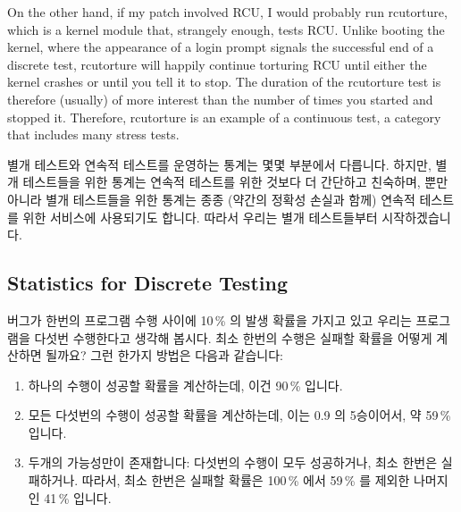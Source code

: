 On the other hand, if my patch involved RCU, I would probably run
rcutorture, which is a kernel module that, strangely enough, tests RCU.
Unlike booting the kernel, where the appearance of a login prompt
signals the successful end of a discrete test, rcutorture will happily
continue torturing RCU until either the kernel crashes or until you
tell it to stop.
The duration of the rcutorture test is therefore (usually) of more
interest than the number of times you started and stopped it.
Therefore, rcutorture is an example of a continuous test, a category
that includes many stress tests.
\fi

별개 테스트와 연속적 테스트를 운영하는 통계는 몇몇 부분에서 다릅니다.
하지만, 별개 테스트들을 위한 통계는 연속적 테스트를 위한 것보다 더 간단하고
친숙하며, 뿐만아니라 별개 테스트들을 위한 통계는 종종 (약간의 정확성 손실과
함께) 연속적 테스트를 위한 서비스에 사용되기도 합니다.
따라서 우리는 별개 테스트들부터 시작하겠습니다.

\subsection{Statistics for Discrete Testing}
\label{sec:debugging:Statistics for Discrete Testing}

버그가 한번의 프로그램 수행 사이에 10\,\% 의 발생 확률을 가지고 있고 우리는
프로그램을 다섯번 수행한다고 생각해 봅시다.
최소 한번의 수행은 실패할 확률을 어떻게 계산하면 될까요?
그런 한가지 방법은 다음과 같습니다:

\begin{enumerate}
\item	하나의 수행이 성공할 확률을 계산하는데, 이건 90\,\% 입니다.
\item	모든 다섯번의 수행이 성공할 확률을 계산하는데, 이는 0.9 의 5승이어서,
	약 59\,\% 입니다.
\item	두개의 가능성만이 존재합니다: 다섯번의 수행이 모두 성공하거나, 최소
	한번은 실패하거나.
	따라서, 최소 한번은 실패할 확률은 100\,\% 에서 59\,\% 를 제외한
	나머지인 41\,\% 입니다.

\end{enumerate}

